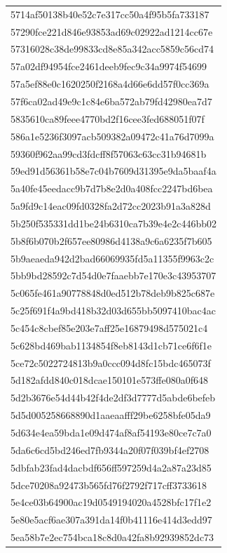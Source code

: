 \begin{tabular}{l}
5714af50138b40e52c7e317cc50a4f95b5fa733187 \\
57290fce221d846e93853ad69c02922ad1214cc67e \\
57316028c38de99833cd8e85a342acc5859c56cd74 \\
57a02df94954fce2461deeb9fec9c34a9974f54699 \\
57a5ef88e0c1620250f2168a4d66e6dd57f0cc369a \\
57f6ca02ad49e9c1c84e6ba572ab79fd42980ea7d7 \\
5835610ca89feee4770bd2f16cee3fed688051f07f \\
586a1e5236f3097acb509382a09472c41a76d7099a \\
59360f962aa99cd3fdcff8f57063c63cc31b94681b \\
59ed91d56361b58e7c04b7609d31395e9da5baaf4a \\
5a40fe45eedacc9b7d7b8e2d0a408fcc2247bd6bea \\
5a9fd9c14eac09fd0328fa2d72cc2023b91a3a828d \\
5b250f535331dd1be24b6310ca7b39e4e2c446bb02 \\
5b8f6b070b2f657ee80986d4138a9c6a6235f7b605 \\
5b9aeaeda942d2bad66069935fd5a11355f9963c2c \\
5bb9bd28592c7d54d0e7faaebb7e170e3c43953707 \\
5c065fe461a90778848d0ed512b78deb9b825c687e \\
5c25f691f4a9bd418b32d03d655bb5097410bac4ac \\
5c454c8cbef85e203e7aff25e16879498d575021c4 \\
5c628bd469bab1134854f8eb8143d1cb71ce6f6f1e \\
5ce72c5022724813b9a0ccc094d8fc15bdc465073f \\
5d182afdd840c018dcae150101e573ffe080a0f648 \\
5d2b3676e54d44b42f4de2df3d7777d5abde6befeb \\
5d5d005258668890d1aaeaafff29be6258bfe05da9 \\
5d634e4ea59bda1e09d474af8af54193e80ce7c7a0 \\
5da6c6cd5bd246ed7fb9344a20f07f039bf4ef2708 \\
5dbfab23fad4dacbdf656ff597259d4a2a87a23d85 \\
5dce70208a92473b565fd76f2792f717cff3733618 \\
5e4ce03b64900ac19d0549194020a4528bfc17f1e2 \\
5e80e5acf6ae307a391da14f0b41116e414d3edd97 \\
5ea58b7e2ec754bca18c8d0a42fa8b92939852dc73 \\

\end{tabular}
